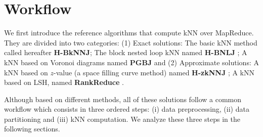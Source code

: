 \section{Workflow}\label{workflowsec}
We first introduce the reference algorithms that compute kNN over MapReduce. They are divided into two categories: (1) Exact solutions:  The basic kNN method called hereafter \textbf{H-BkNNJ}; The block nested loop kNN named \textbf{H-BNLJ} \cite{Zhang:2012:EPK:2247596.2247602}; A kNN based on Voronoi diagrams named \textbf{PGBJ} \cite{Lu:2012:EPK:2336664.2336674} and (2) Approximate solutions:  A kNN based on $z$-value (a space filling curve method) named \textbf{H-zkNNJ} \cite{Zhang:2012:EPK:2247596.2247602};  A kNN based on LSH, named \textbf{RankReduce} \cite{Stupar10rankreduce-}.

Although based on different methods, all of these solutions follow a common workflow which consists in three ordered steps: (i) data preprocessing, (ii) data partitioning and (iii) kNN computation. We analyze these three steps in the following sections.
